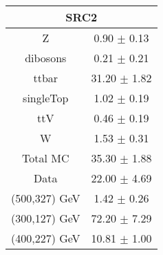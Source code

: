 \begin{tabular}{c|c}
\hline\hline
\multicolumn{2}{c}{\bf SRC2 } \\ \hline 
Z & 0.90 $\pm$ 0.13 \\
dibosons & 0.21 $\pm$ 0.21 \\
ttbar & 31.20 $\pm$ 1.82 \\
singleTop & 1.02 $\pm$ 0.19 \\
ttV & 0.46 $\pm$ 0.19 \\
W & 1.53 $\pm$ 0.31 \\
\hline
Total MC & 35.30 $\pm$ 1.88 \\
Data & 22.00 $\pm$ 4.69 \\
\hline
(500,327) GeV & 1.42 $\pm$ 0.26  \\
\hline
(300,127) GeV & 72.20 $\pm$ 7.29  \\
\hline
(400,227) GeV & 10.81 $\pm$ 1.00 \\
\hline\hline
\end{tabular}
